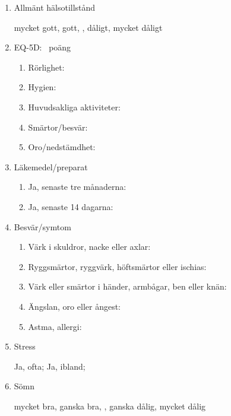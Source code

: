 \documentclass[a4paper,twocolumn,swedish,11pt]{article}
\begin{document}
\begin{enumerate}
	\item Allmänt hälsotillstånd

		{\footnotesize mycket gott, gott, , dåligt, mycket dåligt}

	\item EQ-5D: {\footnotesize {}~poäng}

		{\footnotesize\begin{enumerate}
			\item Rörlighet:

			\item Hygien:

			\item Huvudsakliga aktiviteter:

			\item Smärtor/besvär:

			\item Oro/nedstämdhet:
		\end{enumerate}}

	\item Läkemedel/preparat

		{\footnotesize\begin{enumerate}
			\item Ja, senaste tre månaderna:
			\item Ja, senaste 14 dagarna:
		\end{enumerate}}

	\item Besvär/symtom

		{\footnotesize\begin{enumerate}
			\item Värk i skuldror, nacke eller axlar:
			\item Ryggsmärtor, ryggvärk, höftsmärtor eller ischias:
			\item Värk eller smärtor i händer, armbågar, ben eller knän:
			\item Ängslan, oro eller ångest:
			\item Astma, allergi:
		\end{enumerate}}

	\item Stress

		{\footnotesize Ja, ofta; Ja, ibland; }

	\item Sömn

		{\footnotesize mycket bra, ganska bra, , ganska dålig, mycket dålig}


\end{enumerate}
\end{document}
